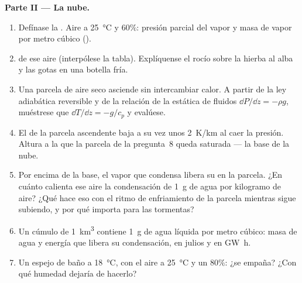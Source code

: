 \begin{problem}
\medskip
\noindent\textbf{Parte II --- La nube.}
\begin{enumerate}[resume]
  \item Defínase la . Aire a \qty{25}{\degreeCelsius} y $60\%$:
        presión parcial del vapor y masa de vapor por metro cúbico
        ().
  \item {} de ese aire (interpólese la tabla). Explíquense el
        rocío sobre la hierba al alba y las gotas en una botella fría.
  \item Una parcela de aire seco asciende sin intercambiar calor. A partir
        de la ley adiabática reversible y de la relación de la estática de
        fluidos $\dd P/\dd z = -\rho g$, muéstrese que $\dd T/\dd z = -g/c_p$ y
        evalúese.
  \item El  de la parcela ascendente baja a su vez unos
        \qty{2}{K/km} al caer la presión. Altura a la que la parcela de la
        pregunta~8 queda saturada --- la base de la nube.
  \item Por encima de la base, el vapor que condensa libera su  en la parcela. ¿En cuánto calienta ese aire la
        condensación de \qty{1}{g} de agua por kilogramo de aire? ¿Qué
        hace eso con el ritmo de enfriamiento de la parcela mientras sigue
        subiendo, y por qué importa para las tormentas?
  \item Un cúmulo de \qty{1}{km^3} contiene \qty{1}{g} de agua líquida por
        metro cúbico: masa de agua y energía que libera su condensación,
        en julios y en \unit{GW h}.
  \item Un espejo de baño a \qty{18}{\degreeCelsius}, con el aire a
        \qty{25}{\degreeCelsius} y un $80\%$: ¿se empaña? ¿Con qué humedad
        dejaría de hacerlo?
\end{enumerate}


\end{problem}
